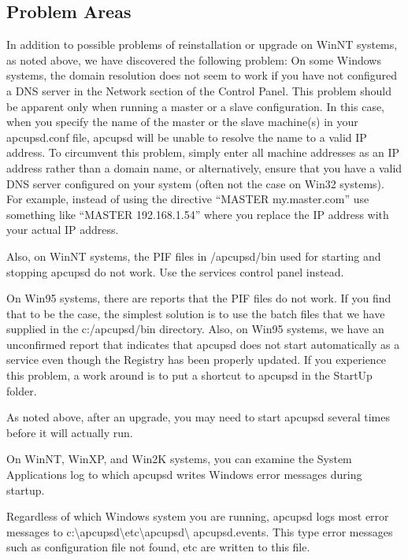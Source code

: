 {{{{{{{{{{\label{Problem-Areas}

\subsection*{Problem Areas}

\label{index-Problems_002c-Windows-178}
\label{index-Windows_002c-Problems-179}
In addition to possible problems of reinstallation or upgrade on WinNT
systems, as noted above, we have discovered the following problem: On some
Windows systems, the domain resolution does not seem to work if you have not
configured a DNS server in the Network section of the Control Panel. This
problem should be apparent only when running a master or a slave
configuration. In this case, when you specify the name of the master or the
slave machine(s) in your apcupsd.conf file, apcupsd will be unable to resolve
the name to a valid IP address. To circumvent this problem, simply enter all
machine addresses as an IP address rather than a domain name, or
alternatively, ensure that you have a valid DNS server configured on your
system (often not the case on Win32 systems).  For example, instead of using
the directive ``MASTER my.master.com'' use something like ``MASTER
192.168.1.54'' where you replace the IP address with your actual IP address.  

Also, on WinNT systems, the PIF files in /apcupsd/bin used for starting and
stopping apcupsd do not work. Use the services control panel instead.  

On Win95 systems, there are reports that the PIF files do not work. If you
find that to be the case, the simplest solution is to use the batch files that
we have supplied in the c:/apcupsd/bin directory. Also, on Win95 systems, we
have an unconfirmed report that indicates that apcupsd does not start
automatically as a service even though the Registry has been properly updated.
If you experience this problem, a work around is to put a shortcut to apcupsd
in the StartUp folder.  

As noted above, after an upgrade, you may need to start apcupsd several times
before it will actually run.  

On WinNT, WinXP, and Win2K systems, you can examine the System Applications
log to which apcupsd writes Windows error messages during startup.  

Regardless of which Windows system you are running, apcupsd logs most error
messages to
c:\textbackslash{}apcupsd\textbackslash{}etc\textbackslash{}apcupsd\textbackslash
{}apcupsd.events. This type error messages such as configuration file not
found, etc are written to this file. 

}}}}}}}}}}
